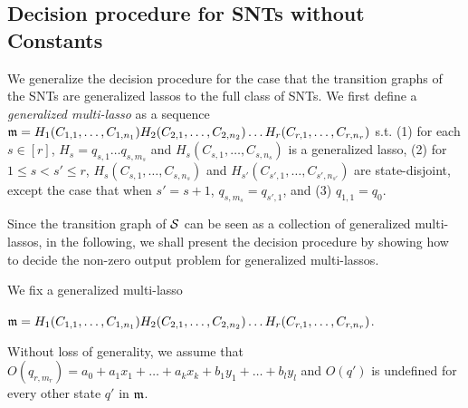 \vspace{-2mm}
\subsection{Decision procedure for SNTs without Constants}\label{sec-gflat}
\vspace{-1mm}

We generalize the decision procedure for the case that the transition graphs of the SNTs are generalized lassos to the full class of SNTs.
We first define a \emph{generalized multi-lasso} as a sequence $\mathfrak{m}= H_1 (C_{1,1},\dots,C_{1,n_1}) H_2 (C_{2,1},\dots,C_{2,n_2}) \dots H_r (C_{r,1},\dots, C_{r, n_r})$ s.t. (1) for each $s\in[r]$, $H_s = q_{s,1} \dots q_{s, m_s}$ and $H_s (C_{s,1},\dots,C_{s, n_s})$ is a generalized lasso, (2) for $1 \leq s< s' \leq r$, $H_s (C_{s,1},\dots,C_{s, n_s})$ and $H_{s'} (C_{s', 1},\dots,C_{s', n_{s'}})$ are state-disjoint, except the case that when $s'=s+1$, $q_{s, m_s}=q_{s',1}$, and (3) $q_{1,1}=q_0$.

Since the transition graph of ${\mathcal{S} }$ can be seen as a collection of generalized multi-lassos, in the following, we shall present the decision procedure by showing how to decide the non-zero output problem for generalized multi-lassos. 

We fix a generalized multi-lasso

\smallskip
\hspace{8mm} $\mathfrak{m}= H_1 (C_{1,1},\dots,C_{1,n_1}) H_2 (C_{2,1},\dots,C_{2,n_2}) \dots H_r (C_{r,1},\dots, C_{r, n_r})$.

\smallskip
\noindent Without loss of generality, we assume that $O(q_{r,m_r})=a_0+a_1 x_1 + \dots + a_k x_k + b_1 y_1  + \dots + b_l y_l$ and $O(q')$ is undefined for every other state $q'$ in $\mathfrak{m}$.\smallskip\\
\smallskip

